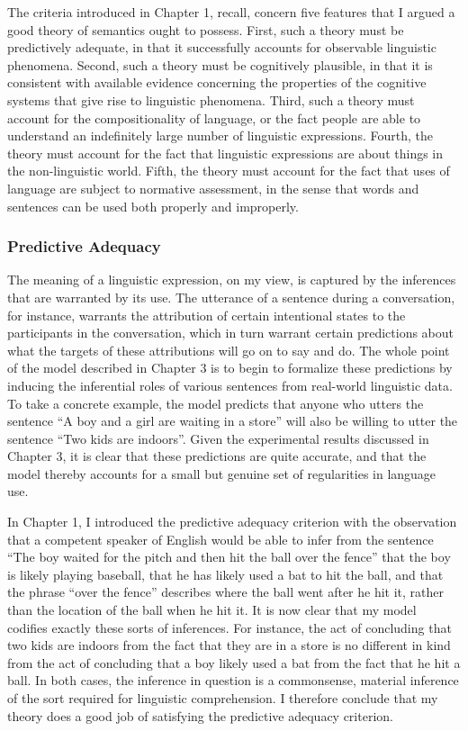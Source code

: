 The criteria introduced in Chapter 1, recall, concern five features that I argued a good theory of semantics ought to possess. First, such a theory must be predictively adequate, in that it successfully accounts for observable linguistic phenomena. Second, such a theory must be cognitively plausible, in that it is consistent with available evidence concerning the properties of the cognitive systems that give rise to linguistic phenomena. Third, such a theory must account for the compositionality of language, or the fact people are able to understand an indefinitely large number of linguistic expressions. Fourth, the theory must account for the fact that linguistic expressions are about things in the non-linguistic world. Fifth, the theory must account for the fact that uses of language are subject to normative assessment, in the sense that words and sentences can be used both properly and improperly.

\subsubsection{Predictive Adequacy}

The meaning of a linguistic expression, on my view, is captured by the inferences that are warranted by its use. The utterance of a sentence during a conversation, for instance, warrants the attribution of certain intentional states to the participants in the conversation, which in turn warrant certain predictions about what the targets of these attributions will go on to say and do. The whole point of the model described in Chapter 3 is to begin to formalize these predictions by inducing the inferential roles of various sentences from real-world linguistic data. To take a concrete example, the model predicts that anyone who utters the sentence ``A boy and a girl are waiting in a store'' will also be willing to utter the sentence ``Two kids are indoors''. Given the experimental results discussed in Chapter 3, it is clear that these predictions are quite accurate, and that the model thereby accounts for a small but genuine set of regularities in language use. 

In Chapter 1, I introduced the predictive adequacy criterion with the observation that a competent speaker of English would be able to infer from the sentence ``The boy waited for the pitch and then hit the ball over the fence'' that the boy is likely playing baseball, that he has likely used a bat to hit the ball, and that the phrase ``over the fence'' describes where the ball went after he hit it, rather than the location of the ball when he hit it. It is now clear that my model codifies exactly these sorts of inferences. For instance, the act of concluding that two kids are indoors from the fact that they are in a store is no different in kind from the act of concluding that a boy likely used a bat from the fact that he hit a ball. In both cases, the inference in question is a commonsense, material inference of the sort required for linguistic comprehension. I therefore conclude that my theory does a good job of satisfying the predictive adequacy criterion. 

